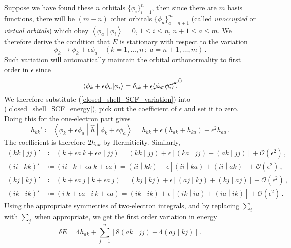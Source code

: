 \documentclass{article}
\theoremstyle{plain}\theoremheaderfont{\normalfont\itshape}\theorembodyfont{\rmfamily}\theoremseparator{.}\newtheorem*{rem}{Remark}\newtheorem*{ex}{Example}\newtheorem*{proof}{Proof}\newtheorem*{altp}{Alternative proof}
\theoremstyle{plain}\theoremheaderfont{\normalfont\bfseries}\theorembodyfont{\rmfamily}\theoremseparator{.}\newtheorem{thm}{Theorem}[section]\newtheorem{lem}[thm]{Lemma}\newtheorem{prop}[thm]{Proposition}\newtheorem*{cor}{Corollary}\newtheorem{defn}[thm]{Definition}\newtheorem{clm}[thm]{Claim}\newtheorem{clminproof}{Claim}
\theoremstyle{break}\theoremheaderfont{\normalfont\itshape}\theorembodyfont{\rmfamily}\theoremseparator{.\medskip}\newtheorem*{proofskip}{Proof}\newtheorem*{exs}{Examples}\newtheorem*{rems}{Remarks}
\theoremstyle{break}\theoremheaderfont{\normalfont\bfseries}\theorembodyfont{\rmfamily}\theoremseparator{.\medskip}\newtheorem{lemskip}[thm]{Lemma}\newtheorem{defnskip}[thm]{Definition}\newtheorem{propskip}[thm]{Proposition}\newtheorem{thmskip}[thm]{Theorem}
\numberwithin{equation}{section}
\newcommand{\braket}[2]{\left\langle #1 \middle| #2 \right\rangle}
\newcommand{\expval}[2]{\left\langle #2 \middle| #1 \middle| #2 \right\rangle}
\newcommand{\bracket}[2]{\left( #1 \middle| #2 \right)}
\begin{document}
    Suppose we have found these \(n\) orbitals \(\{\phi_i\}_{i=1}^{n}\), then since there are \(m\) basis functions, there will be \((m-n)\) other orbitals \(\{\phi_a\}_{a=n+1}^{m}\) (called \textit{unoccupied} or \textit{virtual orbitals}) which obey \(\braket{\phi_a}{\phi_i}=0\), \(1\le i\le n\), \(n+1\le a\le m\). We therefore derive the condition that \(E\) is stationary with respect to the variation
    \begin{equation}\label{closed_shell_SCF_variation}
        \phi_k\to\phi_k+\epsilon\phi_a\quad(k=1,\dots,n\,;\; a=n+1,\dots,m)\,.
    \end{equation}
    Such variation will automatically maintain the orbital orthonormality to first order in \(\epsilon\) since
    \begin{equation}
        \braket{\phi_k+\epsilon\phi_a}{\phi_i}=\delta_{ik}+\epsilon\cancelto{0}{\braket{\phi_a}{\phi_i}}\,.
    \end{equation}
    We therefore substitute (\ref{closed_shell_SCF_variation}) into (\ref{closed_shell_SCF_energy}), pick out the coefficient of \(\epsilon\) and set it to zero. Doing this for the one-electron part gives
    \begin{equation}
        h_{kk}'\coloneqq\expval{\hat{h}}{\phi_k+\epsilon\phi_a}=h_{kk}+\epsilon(h_{ak}+h_{ka})+\epsilon^2h_{aa}\,.
    \end{equation}
    The coefficient is therefore \(2h_{ak}\) by Hermiticity. Similarly,
    \begin{align}
        \bracket{kk}{jj}'&\coloneqq\bracket{k+\epsilon a\ k+\epsilon a}{jj}=\bracket{kk}{jj}+\epsilon[\bracket{ka}{jj}+\bracket{ak}{jj}]+\mathcal{O}(\epsilon^2)\,,\\
        \bracket{ii}{kk}'&\coloneqq\bracket{ii}{k+\epsilon a\ k+\epsilon a}=\bracket{ii}{kk}+\epsilon[\bracket{ii}{ka}+\bracket{ii}{ak}]+\mathcal{O}(\epsilon^2)\,,\\
        \bracket{kj}{kj}'&\coloneqq\bracket{k+\epsilon a\ j}{k+\epsilon a\ j}=\bracket{kj}{kj}+\epsilon[\bracket{aj}{kj}+\bracket{kj}{aj}]+\mathcal{O}(\epsilon^2)\,,\\
        \bracket{ik}{ik}'&\coloneqq\bracket{i\ k+\epsilon a}{i\ k+\epsilon a}=\bracket{ik}{ik}+\epsilon[\bracket{ik}{ia}+\bracket{ia}{ik}]+\mathcal{O}(\epsilon^2)\,.
    \end{align}
    Using the appropriate symmetries of two-electron integrals, and by replacing \(\sum_i\) with \(\sum_j\) when appropriate, we get the first order variation in energy
    \begin{equation}
        \delta E=4h_{ak}+\sum_{j=1}^{n}[8\bracket{ak}{jj}-4\bracket{aj}{kj}]\,.
    \end{equation}
\end{document}
